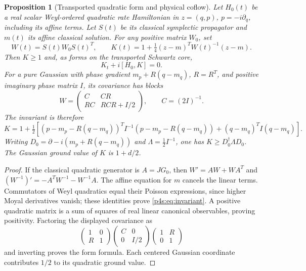 \documentclass[11pt]{article}
\numberwithin{equation}{section}
\newtheorem{proposition}[theorem]{Proposition}
\theoremstyle{definition}
\theoremstyle{remark}
\begin{document}
\begin{proposition}[Transported quadratic form and physical coflow]
\label{p4s:prop:invariant}
Let $H_0(t)$ be a real scalar Weyl-ordered quadratic rate Hamiltonian
in $z=(q,p)$, $p=-i\partial_q$, including its affine terms. Let $S(t)$
be its classical symplectic propagator and $m(t)$ its affine classical
solution. For any positive matrix $W_0$, set
\[
 W(t)=S(t)W_0S(t)^T,\qquad
 K(t)=1+\tfrac14(z-m)^TW(t)^{-1}(z-m).
\]
Then $K\geq1$ and, as forms on the transported Schwartz core,
\begin{equation}\label{p4s:eq:invariant}
 K_t+i[H_0,K]=0 .
\end{equation}
For a pure Gaussian with phase gradient
$m_p+R(q-m_q)$, $R=R^T$, and positive imaginary phase matrix $I$,
its covariance has blocks
\[
 W=\begin{pmatrix}C&CR\\RC&RCR+I/2\end{pmatrix},\qquad C=(2I)^{-1}.
\]
The invariant is therefore
\[
 K=1+\tfrac12\left[
 (p-m_p-R(q-m_q))^TI^{-1}(p-m_p-R(q-m_q))
                     +(q-m_q)^TI(q-m_q)\right].
\]
Writing $D_0=\partial-i(m_p+R(q-m_q))$ and
$\Lambda=\tfrac12I^{-1}$, one has $K\geq D_0^\dagger\Lambda D_0$.
The Gaussian ground value of $K$ is $1+d/2$.
\end{proposition}
\begin{proof}
If the classical quadratic generator is $A=JG_0$, then
$W'=AW+WA^T$ and
$(W^{-1})'=-A^TW^{-1}-W^{-1}A$. The affine equation for $m$
cancels the linear terms. Commutators of Weyl quadratics equal their
Poisson expressions, since higher Moyal derivatives vanish; these
identities prove \eqref{p4s:eq:invariant}. A positive quadratic
matrix is a sum of squares of real linear canonical observables,
proving positivity. Factoring the displayed covariance as
\[
 \begin{pmatrix}1&0\\R&1\end{pmatrix}
 \begin{pmatrix}C&0\\0&I/2\end{pmatrix}
 \begin{pmatrix}1&R\\0&1\end{pmatrix}
\]
and inverting proves the form formula. Each centered Gaussian
coordinate contributes $1/2$ to its quadratic ground value.
\end{proof}
\end{document}
